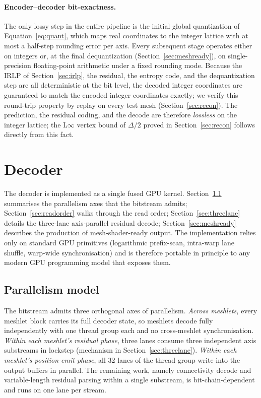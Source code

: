\documentclass[pdflatex,sn-vancouver-num]{sn-jnl}%
\theoremstyle{thmstyleone}%
\theoremstyle{thmstyletwo}%
\theoremstyle{thmstylethree}%
\begin{document}
\paragraph{Encoder--decoder bit-exactness.}
The only lossy step in the entire pipeline is the initial global quantization of Equation~\eqref{eq:quant}, which maps real coordinates to the integer lattice with at most a half-step rounding error per axis. Every subsequent stage operates either on integers or, at the final dequantization (Section~\ref{sec:meshready}), on single-precision floating-point arithmetic under a fixed rounding mode. Because the IRLP of Section~\ref{sec:irlp}, the residual, the entropy code, and the dequantization step are all deterministic at the bit level, the decoded integer coordinates are guaranteed to match the encoded integer coordinates exactly; we verify this round-trip property by replay on every test mesh (Section~\ref{sec:recon}). The prediction, the residual coding, and the decode are therefore \emph{lossless} on the integer lattice; the L$\infty$ vertex bound of $\Delta/2$ proved in Section~\ref{sec:recon} follows directly from this fact.

\section{Decoder}\label{sec:decoder}

The decoder is implemented as a single fused GPU kernel. Section~\ref{sec:parallelism} summarises the parallelism axes that the bitstream admits; Section~\ref{sec:readorder} walks through the read order; Section~\ref{sec:threelane} details the three-lane axis-parallel residual decode; Section~\ref{sec:meshready} describes the production of mesh-shader-ready output. The implementation relies only on standard GPU primitives (logarithmic prefix-scan, intra-warp lane shuffle, warp-wide synchronisation) and is therefore portable in principle to any modern GPU programming model that exposes them.

\subsection{Parallelism model}\label{sec:parallelism}

The bitstream admits three orthogonal axes of parallelism. \emph{Across meshlets}, every meshlet block carries its full decoder state, so meshlets decode fully independently with one thread group each and no cross-meshlet synchronisation. \emph{Within each meshlet's residual phase}, three lanes consume three independent axis substreams in lockstep (mechanism in Section~\ref{sec:threelane}). \emph{Within each meshlet's position-emit phase}, all 32 lanes of the thread group write into the output buffers in parallel. The remaining work, namely connectivity decode and variable-length residual parsing within a single substream, is bit-chain-dependent and runs on one lane per stream.
\end{document}
